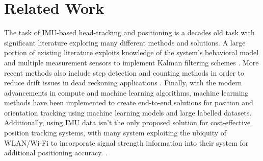 \chapter{Related Work}
The task of IMU-based head-tracking and positioning is a decades old task with significant literature exploring many different methods and solutions. A large portion of existing literature exploits knowledge of the system's behavioral model and multiple measurement sensors to implement Kalman filtering schemes \cite{sabatini_2011_kalmanfilterbased, hellmers_2013_an}. More recent methods also include step detection and counting methods in order to reduce drift issues in dead reckoning applications \cite{tiwari_2022_a, huang_2022_improvement}. Finally, with the modern advancements in compute and machine learning algorithms, machine learming methods have been implemented to create end-to-end solutions for position and orientation tracking using machine learning models and large labelled datasets. Additionally, using IMU data isn't the only proposed solution for cost-effective position tracking systems, with many system exploiting the ubiquity of WLAN/Wi-Fi to incorporate signal strength information into their system for additional positioning accuracy. \cite{stanculeanu_2012_enhanced, shang_2014_a}.